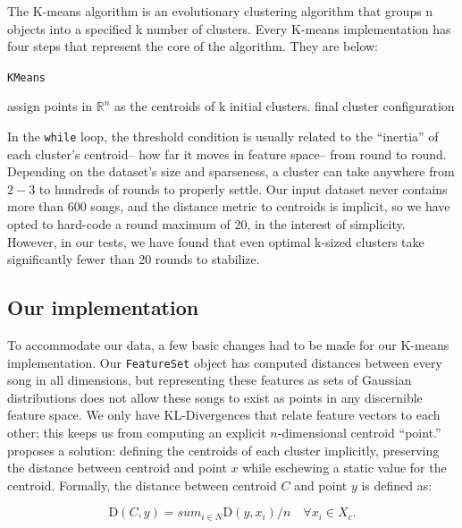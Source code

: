 \documentclass[12pt,twocolumn,titlepage]{article}
\begin{document}
The K-means algorithm is an evolutionary clustering algorithm that groups n  objects into a specified k number of clusters. Every K-means implementation has four steps that represent the core of the algorithm. They are below:

\begin{algorithm}
 \caption{\texttt{KMeans}}\label{algoCPOR}
 assign points in $\mathbb{R}^n$ as the centroids of k initial clusters.\;
 \KwRet final cluster configuration\;
\end{algorithm}

In the \texttt{while} loop, the threshold condition is usually related to the ``inertia'' of each cluster's centroid-- how far it moves in feature space-- from round to round. Depending on the dataset's size and sparseness, a cluster can take anywhere from $2-3$ to hundreds of rounds to properly settle. Our input dataset never contains more than 600 songs, and the distance metric to centroids is implicit, so we have opted to hard-code a round maximum of 20, in the interest of simplicity. However, in our tests, we have found that even optimal k-sized clusters take significantly fewer than 20 rounds to stabilize. 

\subsection{Our implementation}
\label{subsec:impl}

To accommodate our data, a few basic changes had to be made for our K-means implementation. Our \texttt{FeatureSet} object has computed distances between every song in all dimensions, but representing these features as sets of Gaussian distributions does not allow these songs to exist as points in any discernible feature space. We only have KL-Divergences that relate feature vectors to each other; this keeps us from computing an explicit $n$-dimensional centroid ``point.'' \cite{MaggbladeHongKao} proposes a solution: defining the centroids of each cluster implicitly, preserving the distance between centroid and point $x$  while eschewing a static value for the centroid. Formally, the distance between centroid $C$ and point $y$ is defined as:

\begin{equation}\label{}
\mathrm{D}(C, y) = sum_{i \in N}{}{\mathrm{D}(y, x_i) / n} \quad \forall x_i \in X_c.
\end{equation}
\end{document}
